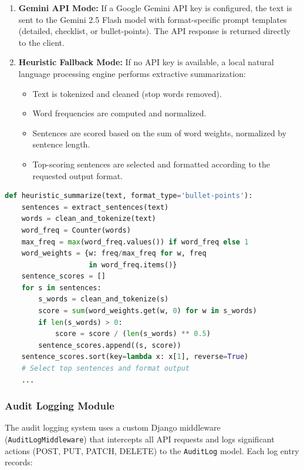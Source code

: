 \begin{enumerate}[label=\arabic*., leftmargin=2em]
    \item \textbf{Gemini API Mode:} If a Google Gemini API key is configured, the text is sent to the Gemini 2.5 Flash model with format-specific prompt templates (detailed, checklist, or bullet-points). The API response is returned directly to the client.
    
    \item \textbf{Heuristic Fallback Mode:} If no API key is available, a local natural language processing engine performs extractive summarization:
    \begin{itemize}
        \item Text is tokenized and cleaned (stop words removed).
        \item Word frequencies are computed and normalized.
        \item Sentences are scored based on the sum of word weights, normalized by sentence length.
        \item Top-scoring sentences are selected and formatted according to the requested output format.
    \end{itemize}
\end{enumerate}

\begin{lstlisting}[language=Python, caption={Heuristic Summarization Algorithm (Excerpt)}]
def heuristic_summarize(text, format_type='bullet-points'):
    sentences = extract_sentences(text)
    words = clean_and_tokenize(text)
    word_freq = Counter(words)
    max_freq = max(word_freq.values()) if word_freq else 1
    word_weights = {w: freq/max_freq for w, freq 
                    in word_freq.items()}
    sentence_scores = []
    for s in sentences:
        s_words = clean_and_tokenize(s)
        score = sum(word_weights.get(w, 0) for w in s_words)
        if len(s_words) > 0:
            score = score / (len(s_words) ** 0.5)
        sentence_scores.append((s, score))
    sentence_scores.sort(key=lambda x: x[1], reverse=True)
    # Select top sentences and format output
    ...
\end{lstlisting}

\subsubsection{Audit Logging Module}

The audit logging system uses a custom Django middleware (\texttt{AuditLogMiddleware}) that intercepts all API requests and logs significant actions (POST, PUT, PATCH, DELETE) to the \texttt{AuditLog} model. Each log entry records:

